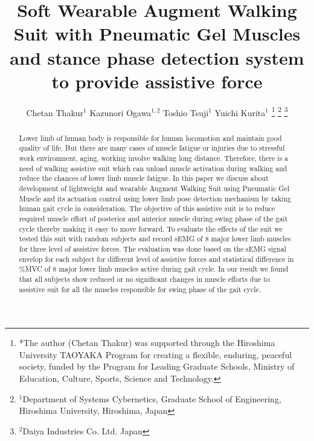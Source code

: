 \documentclass[letterpaper, 10 pt, conference]{ieeeconf}  %
\title{\LARGE \bf
Soft Wearable Augment Walking Suit with Pneumatic Gel Muscles and stance phase detection system to provide assistive force
}
\author{Chetan Thakur$^{1}$ Kazunori Ogawa$^{1,2}$ Toshio Tsuji$^{1}$ Yuichi Kurita$^{1}$%
\thanks{*The author (Chetan Thakur) was supported through the Hiroshima University
TAOYAKA Program for creating a flexible, enduring, peaceful society, funded by the Program for Leading
Graduate Schools, Ministry of Education, Culture, Sports, Science and Technology.}%
\thanks{$^{1}$Department of Systems Cybernetics, Graduate School of Engineering,
	Hiroshima University, Hiroshima, Japan
        {\tt\small }}%
\thanks{$^{2}$Daiya Industries Co. Ltd. Japan
        {\tt\small }}%
}
\begin{document}
\setlength{\pdfpageheight}{11in}
\setlength{\pdfpagewidth}{8.5in}

\maketitle
\thispagestyle{empty}
\pagestyle{empty}

\maketitle
\thispagestyle{empty}
\pagestyle{empty}


\begin{abstract}

Lower limb of human body is responsible for human locomotion and maintain good quality of life. But there are many cases of muscle fatigue or injuries due to stressful work environment, aging, working involve walking long distance. Therefore, there is a need of walking assistive suit which can unload muscle activation during walking and reduce the chances of lower limb muscle fatigue. In this paper we discuss about development of lightweight and wearable Augment Walking Suit using Pneumatic Gel Muscle and its actuation control using lower limb pose detection mechanism by taking human gait cycle in consideration. The objective of this assistive suit is to reduce required muscle effort of posterior and anterior muscle during swing phase of the gait cycle thereby making it easy to move forward. To evaluate the effects of the suit we tested this suit with random subjects and record sEMG of 8 major lower limb muscles for three level of assistive forces. The evaluation was done based on the sEMG signal envelop for each subject for different level of assistive forces and statistical difference in \%MVC of 8 major lower limb muscles active during gait cycle. In our result we found that all subjects show reduced or no significant changes in muscle efforts due to assistive suit for all the muscles responsible for swing phase of the gait cycle. 
\end{abstract}


\end{document}
